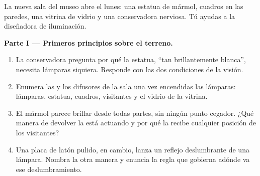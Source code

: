 \begin{problem}\label{pb:g7:light-sources-propagation:1}
La nueva sala del museo abre el lunes: una estatua de mármol, cuadros
en las paredes, una vitrina de vidrio y una conservadora nerviosa. Tú
ayudas a la diseñadora de iluminación.

\medskip\noindent\textbf{Parte I --- Primeros principios sobre el
terreno.}
\begin{enumerate}
  \item La conservadora pregunta por qué la estatua, ``tan
        brillantemente blanca'', necesita lámparas siquiera. Responde
        con las dos condiciones de la visión.
  \item Enumera las  y los difusores de la sala
        una vez encendidas las lámparas: lámparas, estatua, cuadros,
        visitantes y el vidrio de la vitrina.
  \item El mármol parece brillar desde todas partes, sin ningún punto
        cegador. ¿Qué manera de devolver la  está actuando y
        por qué la recibe cualquier posición de los visitantes?
  \item Una placa de latón pulido, en cambio, lanza un
        reflejo deslumbrante de una lámpara. Nombra la otra
        manera y enuncia la regla que gobierna adónde va ese
        deslumbramiento.
\end{enumerate}


\end{problem}
